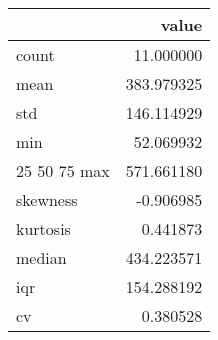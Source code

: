 \begin{tabular}{lr}
\toprule
 & value \\
\midrule
count & 11.000000 \\
mean & 383.979325 \\
std & 146.114929 \\
min & 52.069932 \\
25%
50%
75%
max & 571.661180 \\
skewness & -0.906985 \\
kurtosis & 0.441873 \\
median & 434.223571 \\
iqr & 154.288192 \\
cv & 0.380528 \\
\bottomrule
\end{tabular}

